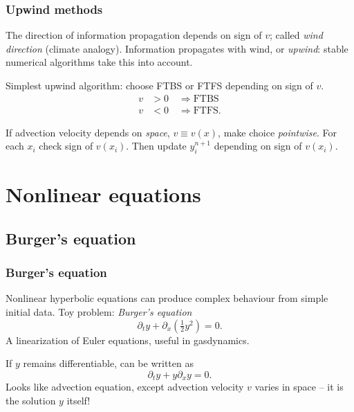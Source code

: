 \documentclass{beamer}
\begin{document}
\begin{frame}
  \frametitle{Upwind methods}

  The direction of information propagation depends on sign of $v$;
  called \emph{wind direction} (climate analogy). \pause
  Information propagates with wind, or \emph{upwind}:
  stable numerical algorithms take this into account. \pause

  \vspace{1ex}

  Simplest upwind algorithm: choose FTBS or FTFS depending on sign of
  $v$.
  \begin{align*}
    v & > 0 \quad \Rightarrow  \text{FTBS} \\
    v & < 0 \quad \Rightarrow  \text{FTFS} .
  \end{align*} \pause

  If advection velocity depends on \emph{space}, $v \equiv v(x)$, make
  choice \emph{pointwise}. \pause For each $x_i$ check sign of
  $v(x_i)$. Then update $y_i^{n+1}$ depending on sign of $v(x_i)$.

\end{frame}


\section{Nonlinear equations}


\subsection{Burger's equation}

\begin{frame}
  \frametitle{Burger's equation}

  Nonlinear hyperbolic equations can produce complex behaviour from
  simple initial data. \pause Toy problem: \emph{Burger's equation}
  \begin{equation*}
    \partial_t y + \partial_x \left( \tfrac{1}{2} y^2 \right) = 0.
  \end{equation*} \pause
  A linearization of Euler equations, useful in gasdynamics. \pause

  \vspace{1ex}

  If $y$ remains differentiable, can be written as
  \begin{equation*}
    \partial_t y + y \partial_x y = 0.
  \end{equation*} \pause
  Looks like advection equation, except advection velocity $v$ varies
  in space -- it is the solution $y$ itself!

\end{frame}
\end{document}
